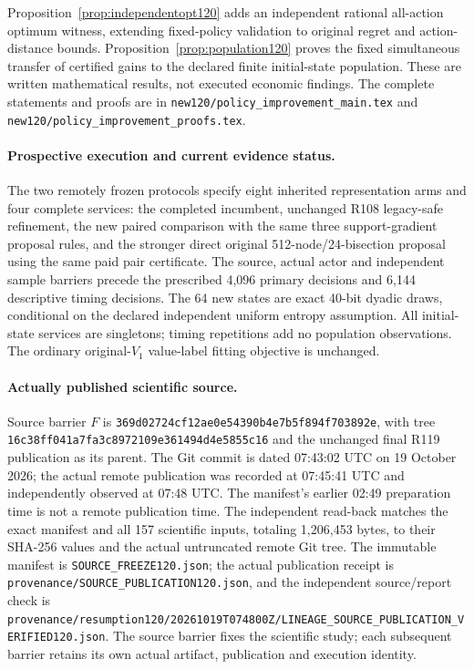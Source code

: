Proposition~\ref{prop:independentopt120} adds an independent rational
all-action optimum witness, extending fixed-policy validation to original
regret and action-distance bounds. Proposition~\ref{prop:population120}
proves the fixed simultaneous transfer of certified gains to the declared
finite initial-state population. These are written mathematical results,
not executed economic findings. The complete statements and proofs are in
\nolinkurl{new120/policy_improvement_main.tex} and
\nolinkurl{new120/policy_improvement_proofs.tex}.

\paragraph{Prospective execution and current evidence status.}
The two remotely frozen protocols specify eight inherited representation
arms and four complete services: the completed incumbent, unchanged R108
legacy-safe refinement, the new paired comparison with the same three
support-gradient proposal rules, and the stronger direct original
512-node/24-bisection proposal using the same paid pair certificate.
The source, actual actor and independent sample barriers precede the
prescribed 4,096 primary decisions and 6,144 descriptive timing decisions.
The 64 new states are exact 40-bit dyadic draws, conditional on the
declared independent uniform entropy assumption. All initial-state
services are singletons; timing repetitions add no population observations.
The ordinary original-$V_1$ value-label fitting objective is unchanged.

\paragraph{Actually published scientific source.}
Source barrier $F$ is \nolinkurl{369d02724cf12ae0e54390b4e7b5f894f703892e},
with tree \nolinkurl{16c38ff041a7fa3c8972109e361494d4e5855c16}
and the unchanged final R119 publication as its parent. The Git commit is
dated 07:43:02 UTC on 19 October 2026; the actual remote publication was
recorded at 07:45:41 UTC and independently observed at 07:48 UTC.
The manifest's earlier 02:49 preparation time is not a remote publication
time. The independent read-back matches the exact manifest and all 157
scientific inputs, totaling 1,206,453 bytes, to their SHA-256 values and
the actual untruncated remote Git tree. The immutable manifest is
\nolinkurl{SOURCE_FREEZE120.json}; the actual publication receipt is
\nolinkurl{provenance/SOURCE_PUBLICATION120.json}, and the independent
source/report check is
\nolinkurl{provenance/resumption120/20261019T074800Z/LINEAGE_SOURCE_PUBLICATION_VERIFIED120.json}.
The source barrier fixes the scientific study; each subsequent barrier
retains its own actual artifact, publication and execution identity.

